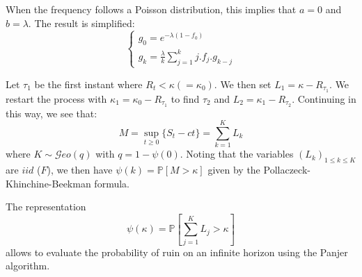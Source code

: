 \begin{f}
	When the frequency follows a Poisson distribution, this implies that {\color{OrangeProfondIRA} \(a=0\) and \(b=\lambda\).}
	The result is simplified:
	\[
\begin{cases}
		g_0= e^{-\lambda (1-f_0)}
	\\
	g_k=\frac{\lambda}{k}\sum_{j=1}^k j . f_j  . g_{k-j}
\end{cases}	
\]
	
\end{f}

\begin{f}
	
	Let \(\tau_1\) be the first instant where \(R_t<\kappa(=\kappa_0)\). We then set \(L_1=\kappa -R_{\tau_1}\).
	We restart the process with \(\kappa_1=\kappa_0-R_{\tau_1}\) to find \(\tau_2\) and \(L_2=\kappa_1 -R_{\tau_2}\).
	Continuing in this way, we see that:
	\[
	M=\sup_{t\geq 0}\{ S_t -ct \} =\sum_{k=1}^{K}L_k
	\]
	where \(K\sim \mathcal{G}eo(q)\) with \(q=1-\psi(0)\).  
	Noting that the variables \(\left( L_k\right)_{1\leq k\leq K}\) are \(iid\) (\(F\)), we then have \(\psi(k)=\mathbb{P}[M>\kappa]\) given by the Pollaczeck-Khinchine-Beekman formula.
	
	
	The representation
	\[
	\psi(\kappa)=\mathbb{P}\left[\sum_{j = 1}^{K}L_j>\kappa \right] 
	\]
	allows to evaluate the probability of ruin on an infinite horizon using the Panjer algorithm.
	
\end{f}





